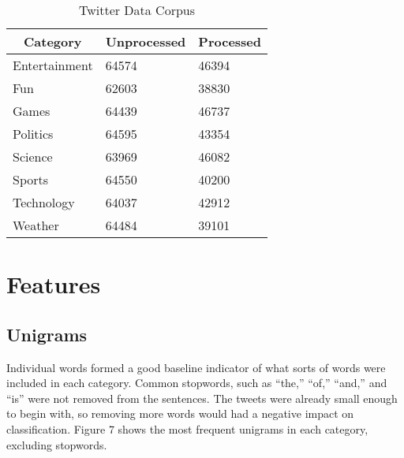 \documentclass[twocolumn]{article}
\begin{document}
\begin{table}[h]
\centering
\caption{Twitter Data Corpus}
\begin{tabular}{|l|l|l|}
\hline
\multicolumn{1}{|c|}{\textbf{Category}} & \multicolumn{1}{c|}{\textbf{Unprocessed}} & \multicolumn{1}{c|}{\textbf{Processed}} \\ \hline
Entertainment                           & 64574                                     & 46394                                   \\ \hline
Fun                                     & 62603                                     & 38830                                   \\ \hline
Games                                   & 64439                                     & 46737                                   \\ \hline
Politics                                & 64595                                     & 43354                                   \\ \hline
Science                                 & 63969                                     & 46082                                   \\ \hline
Sports                                  & 64550                                     & 40200                                   \\ \hline
Technology                              & 64037                                     & 42912                                   \\ \hline
Weather                                 & 64484                                     & 39101                                   \\ \hline
\end{tabular}
\end{table}

\section{Features}

\subsection{Unigrams}

Individual words formed a good baseline indicator of what sorts of words were included in each category. Common stopwords, such as ``the,'' ``of,'' ``and,'' and ``is'' were not removed from the sentences. The tweets were already small enough to begin with, so removing more words would had a negative impact on classification. Figure 7 shows the most frequent unigrams in each category, excluding stopwords.
\end{document}
